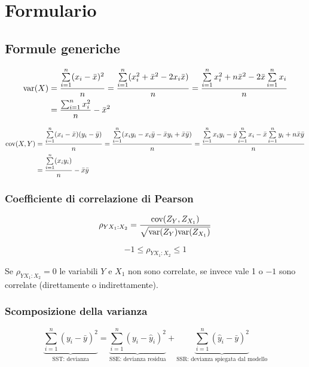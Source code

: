\chapter{Formulario}
\section{Formule generiche}

\begin{align*}
\text{var}(X) &= \frac{\sum\limits_{i=1}^n (x_i - \bar{x})^2}{n}
= \frac{ \sum\limits_{i=1}^n ( x_i^2 + \bar{x}^2   - 2 x_i \bar{x}) }{n}
= \frac{ \sum\limits_{i=1}^n x_i^2 + n\bar{x}^2 -2\bar{x} \sum\limits_{i=1}^n x_i }{ n} \\
&= \frac{\sum_{i=1}^{n} x_i^2}{n} - \bar{x}^2
\end{align*}

\begin{align*}
\text{cov}(X,Y) &= \frac{\sum\limits_{i=1}^n (x_i - \bar{x})(y_i - \bar{y})}{n}
= \frac{ \sum\limits_{i=1}^n (x_iy_i - x_i\bar{y} -\bar{x}y_i + \bar{x}\bar{y})}{n}
= \frac{ \sum\limits_{i=1}^n x_iy_i -\bar{y}\sum\limits_{i=1}^n x_i -\bar{x}\sum\limits_{i=1}^ny_i + n\bar{x}\bar{y}}{n} \\
&= \frac{\sum\limits_{i=1}^{n} (x_iy_i)}{n} - \bar{x}\bar{y}
\end{align*}

\subsection{Coefficiente di correlazione di Pearson}

$$
\rho_{YX_1:X_2} = \frac{\text{cov}(Z_Y, Z_{X_1})}{\sqrt{\text{var}(Z_Y)\text{var}(Z_{X_1})}}
$$

$$
-1 \leq \rho_{YX_1:X_2} \leq 1
$$

Se $\rho_{YX_1:X_2} = 0$ le variabili $ Y $ e $ X_1 $ non sono correlate, se invece vale 1 o $ -1 $ sono correlate (direttamente o indirettamente).

\subsection{Scomposizione della varianza}

$$
\underbrace{\sum\limits_{i=1}^n (y_i - \bar{y})^2}_{\text{SST: devianza}} = 
\underbrace{\sum\limits_{i=1}^n (y_i - \hat{y}_i)^2}_{\text{SSE: devianza residua}}  +
\underbrace{\sum\limits_{i=1}^n (\hat{y}_i - \bar{y})^2}_{\text{SSR: devianza spiegata dal modello}}
$$

